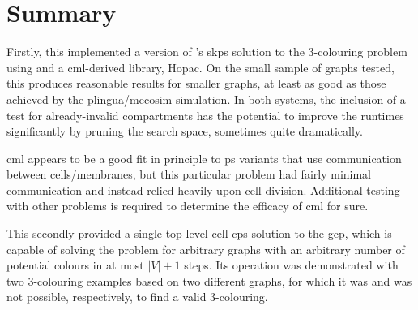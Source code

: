 \section{\label{sec:gcol:conc}Summary}
Firstly, this  implemented a version of \citeauthor{Gheorghe2013}'s \gls{skps} solution to the 3-colouring problem using \fsharp{} and a \gls{cml}-derived library, Hopac.   On the small sample of graphs tested, this produces reasonable results for smaller graphs, at least as good as those achieved by the \gls{plingua}/\gls{mecosim} simulation.  In both systems, the inclusion of a test for already-invalid compartments has the potential to improve the runtimes significantly by pruning the search space, sometimes quite dramatically.

\Gls{cml} appears to be a good fit in principle to \gls{ps} variants that use communication between cells/membranes, but this particular problem had fairly minimal communication and instead relied heavily upon cell division.  Additional testing with other problems is required to determine the efficacy of \gls{cml} for sure.

This  secondly provided a single-top-level-cell \gls{cps} solution to the \gls{gcp}, which is capable of solving the problem for arbitrary graphs with an arbitrary number of potential colours in at most \(|V| + 1\) steps.  Its operation was demonstrated with two 3-colouring examples based on two different graphs, for which it was and was not possible, respectively, to find a valid 3-colouring.
